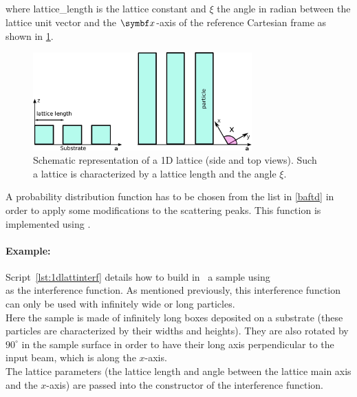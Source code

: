\newpage
\subsection{}
where lattice\_length is the lattice constant and $\xi$ the angle in radian between the lattice unit vector and the $\v{x}$-axis of the reference Cartesian frame as shown in \cref{fig:1dgrating}.

\begin{figure}[tb]
\begin{center}
\includegraphics[width=0.75\textwidth]{fig/drawing/1DGrating.pdf}
\end{center}
\caption{Schematic representation of a 1D lattice (side and top views). Such a lattice is characterized by a lattice length and the angle $\xi$.}
\label{fig:1dgrating}
\end{figure}


\vspace{12pt}
A probability distribution function  has to be chosen from the list in \cref{baftd} in order to apply some modifications to the scattering peaks. This function is implemented using .

\paragraph{Example:} Script~\ref{lst:1dlattinterf} details how to build in  \BornAgain\ a sample using\\  as the interference function. As mentioned previously, this interference function can only be used with infinitely wide or long particles.\\ Here the sample is made of infinitely long boxes deposited on a substrate (these particles are characterized by their widths and heights). They are also rotated by $90^{\circ}$  in the sample surface in order to have their long axis perpendicular to the input beam, which is along the $x$-axis.\\
 The lattice parameters (the lattice length and angle between the lattice main axis and the $x$-axis) are passed into the constructor of the interference function.

